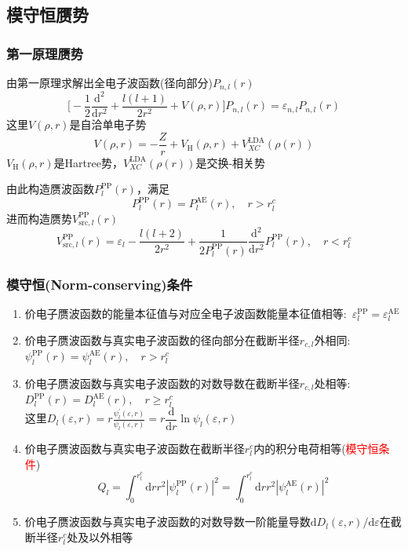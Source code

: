 \subsection{模守恒赝势}
\frame
{
	\frametitle{第一原理赝势}
		由第一原理求解出全电子波函数(径向部分)$P_{n,l}(r)$
			\begin{displaymath}
				\bigg[-\dfrac12\dfrac{\mathrm{d}^2}{\mathrm{d}r^2}+\dfrac{l(l+1)}{2r^2}+V(\rho,r)\bigg]P_{n,l}(r)=\varepsilon_{n,l}P_{n,l}(r)
			\end{displaymath}
			这里$V(\rho,r)$是自洽单电子势
			$$V(\rho,r)=-\frac{Z}r+V_{\mathrm H}(\rho,r)+V_{XC}^{\mathrm{LDA}}(\rho(r))$$
			$V_{\mathrm H}(\rho,r)$是\textrm{Hartree}势，$V_{XC}^{\mathrm{LDA}}(\rho(r))$是交换-相关势

			由此构造赝波函数$P_l^{\mathrm{PP}}(r)$，满足
			$$P_l^{\mathrm{PP}}(r)=P_l^{\mathrm{AE}}(r),\quad r>r_{l}^c$$
			进而构造赝势$V_{\mathrm{src},l}^{\mathrm{PP}}(r)$
			$$V_{\mathrm{src},l}^{\mathrm{PP}}(r)=\varepsilon_l-\dfrac{l(l+2)}{2r^2}+\dfrac{1}{2P_l^{\mathrm{PP}}(r)}\dfrac{\mathrm{d}^2}{\mathrm{d}r^2}P_l^{\mathrm{PP}}(r),\quad r<r_{l}^c$$
}

\frame
{
	\frametitle{模守恒\textrm{(Norm-conserving)}条件}
	\begin{enumerate}
		\item 价电子赝波函数的能量本征值与对应全电子波函数能量本征值相等:~$\varepsilon_l^{\mathrm{PP}}=\varepsilon_l^{\mathrm{AE}}$
		\item 价电子赝波函数与真实电子波函数的径向部分在截断半径$r_{c,l}$外相同:~$\psi_l^{\mathrm{PP}}(r)=\psi_l^{\mathrm{AE}}(r),\quad r>r_{l}^c$
		\item 价电子赝波函数与真实电子波函数的对数导数在截断半径$r_{c,l}$处相等:~$D_l^{\mathrm{PP}}(r)=D_l^{\mathrm{AE}}(r),\quad r\geqslant r_{l}^c$\\
		这里$D_l(\varepsilon,r)=r\frac{\psi_l^{\prime}(\varepsilon,r)}{\psi_l(\varepsilon,r)}=r\dfrac{\mathrm{d}}{\mathrm{d}r}\ln\psi_l(\varepsilon,r)$
		\item 价电子赝波函数与真实电子波函数在截断半径$r_{l}^c$内的积分电荷相等(\textcolor{red}{模守恒条件})
			$$Q_l=\int_0^{r_{l}^c}\mathrm{d}rr^2|\psi_l^{\mathrm{PP}}(r)|^2=\int_0^{r_{l}^c}\mathrm{d}rr^2|\psi_l^{\mathrm{AE}}(r)|^2$$
		\item 价电子赝波函数与真实电子波函数的对数导数一阶能量导数$\mathrm{d}D_l(\varepsilon,r)/\mathrm{d}\varepsilon$在截断半径$r_{l}^c$处及以外相等
	\end{enumerate}
}

